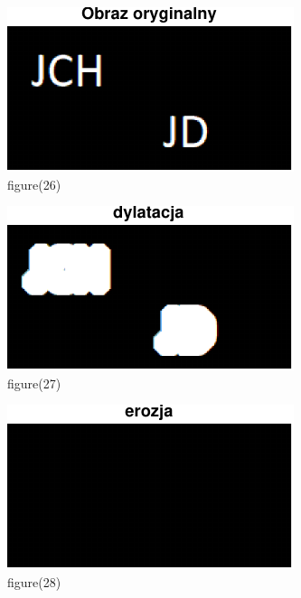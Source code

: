 \documentclass[10pt,a4paper,twoside]{article}%
\begin{document}
\begin{figure}[H]
    \centering
    \includegraphics[width=1\linewidth]{kod matlab/myVectorFile26.pdf}
\caption{figure(26)}
    \label{fig:obr1}
\end{figure}

\begin{figure}[H]
    \centering
    \includegraphics[width=1\linewidth]{kod matlab/myVectorFile27.pdf}
\caption{figure(27)}
    \label{fig:obr1}
\end{figure}

\begin{figure}[H]
    \centering
    \includegraphics[width=1\linewidth]{kod matlab/myVectorFile28.pdf}
\caption{figure(28)}
    \label{fig:obr1}
\end{figure}
\end{document}
